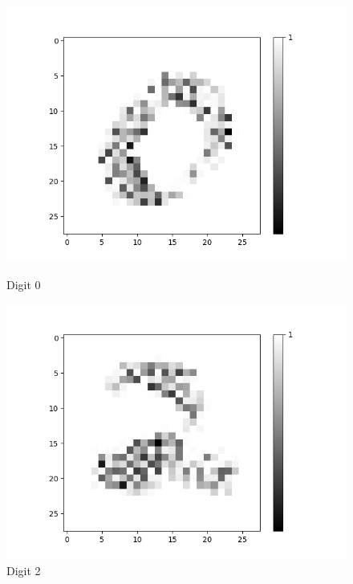 \begin{figure}[H]
	\captionsetup{labelformat=empty}
	\centering
	\begin{minipage}[b]{0.19\textwidth}
		\includegraphics[width=\textwidth]{AND-OLD(LSM)/Layer0-Neuron-0.png}
		\caption{Digit 0}
	\end{minipage}
	\begin{minipage}[b]{0.19\textwidth}
		\includegraphics[width=\textwidth]{AND-OLD(LSM)/Layer0-Neuron-2.png}
		\caption{Digit 2}
	\end{minipage}
	\begin{minipage}[b]{0.19\textwidth}

\end{minipage}
\end{figure}
